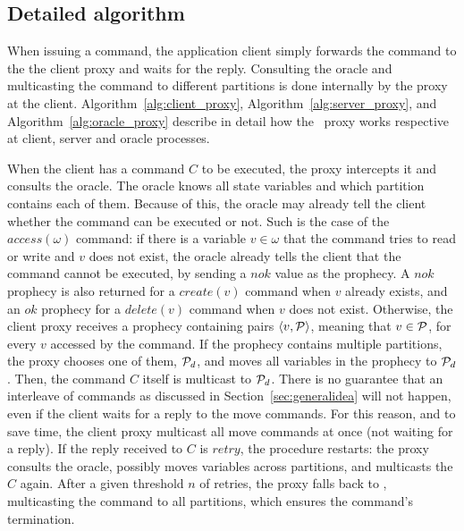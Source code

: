 \subsection{Detailed algorithm}
\label{sec:algorithm}


When issuing a command, the application client simply forwards the command to the the client proxy and waits for the reply.
Consulting the oracle and multicasting the command to different partitions is done internally by the proxy at the client.
Algorithm~\ref{alg:client_proxy}, Algorithm~\ref{alg:server_proxy}, and Algorithm~\ref{alg:oracle_proxy} describe in detail how the \dssmr\ proxy works respective at client, server and oracle processes.



When the client has a command $C$ to be executed, the proxy intercepts it and consults the oracle.
The oracle knows all state variables and which partition contains each of them.
Because of this, the oracle may already tell the client whether the command can be executed or not.
Such is the case of the $access(\omega)$ command: if there is a variable $v \in \omega$ that the command tries to read or write and $v$ does not exist, the oracle already tells the client that the command cannot be executed, by sending a $nok$ value as the prophecy.
A $nok$ prophecy is also returned for a $create(v)$ command when $v$ already exists, and an $ok$ prophecy for a $delete(v)$ command when $v$ does not exist.
Otherwise, the client proxy receives a prophecy containing pairs $\langle v, \mathcal{P} \rangle$, meaning that $v \in \mathcal{P}$, for every $v$ accessed by the command.
If the prophecy contains multiple partitions, the proxy chooses one of them, $\mathcal{P}_d$, and moves all variables in the prophecy to $\mathcal{P}_d$.
Then, the command $C$ itself is multicast to $\mathcal{P}_d$.
There is no guarantee that an interleave of commands as discussed in Section~\ref{sec:generalidea} will not happen, even if the client waits for a reply to the move commands.
For this reason, and to save time, the client proxy multicast all move commands at once (not waiting for a reply).
If the reply received to $C$ is $retry$, the procedure restarts: the proxy consults the oracle, possibly moves variables across partitions, and multicasts the $C$ again.
After a given threshold $n$ of retries, the proxy falls back to \ssmr{}, multicasting the command to all partitions, which ensures the command's termination.

